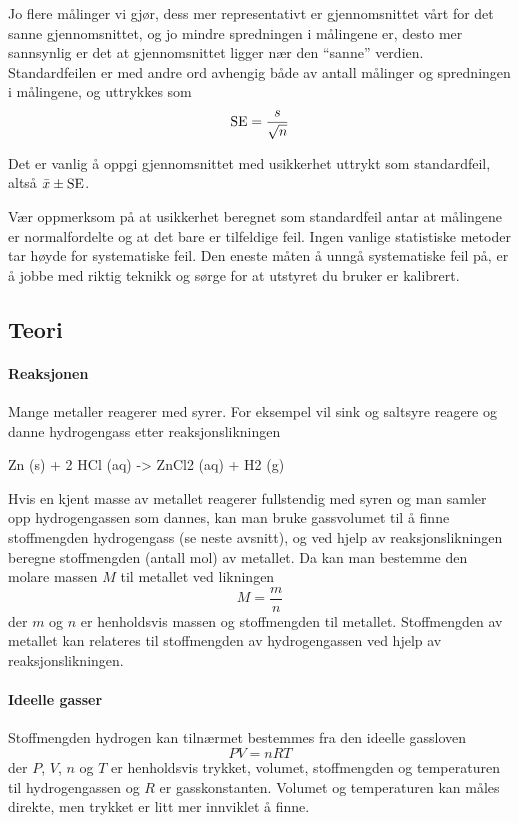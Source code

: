 	Jo flere målinger vi gjør, dess mer representativt er gjennomsnittet vårt for det sanne gjennomsnittet, og jo mindre spredningen i målingene er, desto mer sannsynlig er det at gjennomsnittet ligger nær den ``sanne'' verdien. Standardfeilen er med andre ord avhengig både av antall målinger og spredningen i målingene, og uttrykkes som 
	\begin{equation*}
		\mathrm{SE} =\frac{s}{\sqrt{n}}
	\end{equation*}
	
	Det er vanlig å oppgi gjennomsnittet med usikkerhet uttrykt som standardfeil, altså $\bar{x}\pm \mathrm{SE}$.
	
	Vær oppmerksom på at usikkerhet beregnet som standardfeil antar at målingene er normalfordelte og at det bare er tilfeldige feil. Ingen vanlige statistiske metoder tar høyde for systematiske feil. Den eneste måten å unngå systematiske feil på, er å jobbe med riktig teknikk og sørge for at utstyret du bruker er kalibrert.
	
	\subsection{Teori}
	\paragraph{Reaksjonen}
	Mange metaller reagerer med syrer. For eksempel vil sink og saltsyre reagere og danne hydrogengass etter reaksjonslikningen
	\begin{reaction*}
		Zn (s) + 2 HCl (aq) -> ZnCl2 (aq) + H2 (g) 
	\end{reaction*}
	
	Hvis en kjent masse av metallet reagerer fullstendig med syren og man samler opp hydrogengassen som dannes, kan man bruke gassvolumet til å finne stoffmengden hydrogengass (se neste avsnitt), og ved hjelp av reaksjonslikningen beregne stoffmengden (antall mol) av metallet. Da kan man bestemme den molare massen $M$ til metallet ved likningen
	\begin{equation*}
		M = \frac{m}{n}
	\end{equation*}
	der $m$ og $n$ er henholdsvis massen og stoffmengden til metallet. Stoffmengden av metallet kan relateres til stoffmengden av hydrogengassen ved hjelp av reaksjonslikningen. 
	
	\paragraph{Ideelle gasser}
	Stoffmengden hydrogen kan tilnærmet bestemmes fra den ideelle gassloven
	\begin{equation*}
		PV = nRT
	\end{equation*}
	der $P$, $V$, $n$ og $T$ er henholdsvis trykket, volumet, stoffmengden og temperaturen til hydrogengassen og $R$ er gasskonstanten. Volumet og temperaturen kan måles direkte, men trykket er litt mer innviklet å finne. 
	

